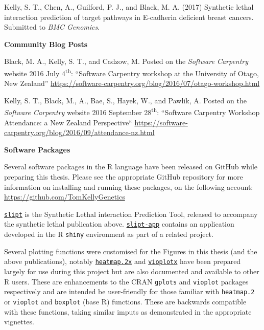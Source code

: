 Kelly, S. T., Chen, A., Guilford, P. J., and Black, M. A. (2017) Synthetic lethal interaction prediction of target pathways in E-cadherin deficient breast cancers. Submitted to \textit{BMC Genomics}.

\textbf{Community Blog Posts}

Black, M. A., Kelly, S. T., and Cadzow, M.
Posted on the \textit{Software Carpentry} website 2016 July 4\textsuperscript{th}: 
``Software Carpentry workshop at the University of Otago, New Zealand''
\url{https://software-carpentry.org/blog/2016/07/otago-workshop.html}

Kelly, S. T., Black, M., A., Bae, S., Hayek, W., and Pawlik, A. Posted on the \textit{Software Carpentry} website 2016 September 28\textsuperscript{th}:  ``Software Carpentry Workshop Attendance: a New Zealand Perspective``
\url{https://software-carpentry.org/blog/2016/09/attendance-nz.html}


\textbf{Software Packages}

Several software packages in the R language have been released on GitHub while preparing this thesis. Please see the appropriate GitHub repository for more information on installing and running these packages, on the following account: \url{https://github.com/TomKellyGenetics}

\href{https://github.com/TomKellyGenetics/slipt}{\texttt{slipt}} is the Synthetic Lethal interaction Prediction Tool, released to accompany the synthetic lethal publication above. \href{https://github.com/TomKellyGenetics/slipt-app}{\texttt{slipt-app}} contains an application developed in the R \texttt{shiny} environment as part of a related project.

Several plotting functions were customised for the Figures in this thesis (and the above publications), notably \href{https://github.com/TomKellyGenetics/heatmap.2x}{\texttt{heatmap.2x}} and \href{https://github.com/TomKellyGenetics/vioplotx}{\texttt{vioplotx}} have been prepared largely for use during this project but are also documented and available to other R users. These are enhancements to the CRAN \texttt{gplots} and \texttt{vioplot} packages respectively and are intended be user-friendly for those familiar with \texttt{heatmap.2} or \texttt{vioplot} and \texttt{boxplot} (base R) functions. These are backwards compatible with these functions, taking similar imputs as demonstrated in the appropriate vignettes.

